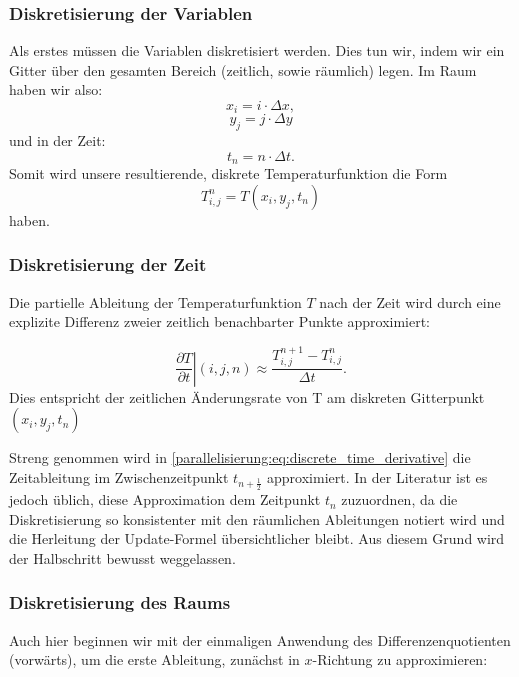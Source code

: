 \subsubsection{Diskretisierung der Variablen}

Als erstes müssen die Variablen diskretisiert werden. Dies tun wir, indem wir ein Gitter über den gesamten Bereich (zeitlich, sowie räumlich) legen. Im Raum haben wir also:
\begin{equation}
	x_i
	=
	i \cdot \Delta x,
\end{equation}
\begin{equation}
	y_j
	=
	j \cdot \Delta y
\end{equation}
und in der Zeit:
\begin{equation}
	t_n
	=
	n \cdot \Delta t.
\end{equation}
Somit wird unsere resultierende, diskrete Temperaturfunktion die Form
\begin{equation}
	T^n_{i,j}
	=
	T(x_i,y_j,t_n)
\end{equation}
haben.


\subsubsection{Diskretisierung der Zeit}

Die partielle Ableitung der Temperaturfunktion \( T \) nach der Zeit wird durch eine explizite Differenz zweier zeitlich benachbarter Punkte approximiert:

\begin{equation}
	\label{parallelisierung:eq:discrete_time_derivative}
	\left. \frac{\partial T}{\partial t}\right|{(i,j,n)}
	\approx
	\frac{T_{i,j}^{n+1} - T_{i,j}^n}{\Delta t}.
\end{equation}
Dies entspricht der zeitlichen Änderungsrate von T am diskreten Gitterpunkt \((x_i, y_j, t_n)\)

Streng genommen wird in \eqref{parallelisierung:eq:discrete_time_derivative}
die Zeitableitung im Zwischenzeitpunkt \(t_{n+\frac{1}{2}}\) approximiert. 
In der Literatur ist es jedoch üblich, diese Approximation dem Zeitpunkt \(t_n\) zuzuordnen, 
da die Diskretisierung so konsistenter mit den räumlichen Ableitungen notiert wird und die 
Herleitung der Update-Formel übersichtlicher bleibt. 
Aus diesem Grund wird der Halbschritt bewusst weggelassen.


\subsubsection{Diskretisierung des Raums}
Auch hier beginnen wir mit der einmaligen Anwendung des Differenzenquotienten (vorwärts), um die erste Ableitung, zunächst in $x$-Richtung zu approximieren:


